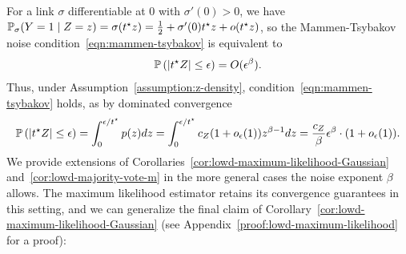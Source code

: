 For a link $\sigma$ differentiable at $0$ with
$\sigma'(0) > 0$, we have $\mathbb{P}_\sigma(Y = 1 \mid Z = z) = \sigma(t^\star z) =
\frac{1}{2} + \sigma'(0) t^\star z + o(t^\star z)$, so the Mammen-Tsybakov noise
condition~\eqref{eqn:mammen-tsybakov} is equivalent to
\begin{align*}
  \mathbb{P} \left( \left|t^\star Z \right| \leq \epsilon \right) = O(\epsilon^\beta).
\end{align*}
Thus,
under Assumption~\ref{assumption:z-density},
condition~\eqref{eqn:mammen-tsybakov} holds, as
by dominated convergence%
\begin{align*}
  \mathbb{P}\left(|t^\star Z| \le \epsilon\right)
  = \int_0^{\epsilon/t^\star} p(z) dz
  = \int_0^{\epsilon/t^\star} c_Z(1 + o_\epsilon(1)) z^{\beta - 1} dz
  = \frac{c_Z}{\beta} \epsilon^\beta \cdot (1 + o_\epsilon(1)).
\end{align*}
We provide extensions of
Corollaries~\ref{cor:lowd-maximum-likelihood-Gaussian}
and~\ref{cor:lowd-majority-vote-m} in the more general cases the noise
exponent $\beta$ allows.
%
The maximum likelihood estimator retains its convergence guarantees in this
setting, and we can generalize the final claim of
Corollary~\ref{cor:lowd-maximum-likelihood-Gaussian} (see
Appendix~\ref{proof:lowd-maximum-likelihood} for a proof):


